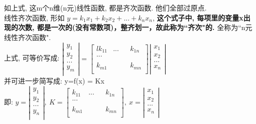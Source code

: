 \documentclass[UTF8]{ctexart}
\begin{document}
如上式, 这m个n维(n元)线性函数, 都是齐次函数. 他们全部过原点. \\
线性齐次函数, 形如 $	y=k_{1}x_1+k_{2}x_2+...+k_{n}x_n$, \textbf{这个式子中, 每项里的变量x出现的次数, 都是一次的(没有常数项)，整齐划一，故此称为``齐次"的.} 全称为``n元线性齐次函数". \\

上式, 可等价写成: 
$
\left| \begin{array}{l}
	y_1\\
	y_2\\
	...\\
	y_m\\
\end{array} \right|=\left[ \begin{matrix}{l}
	k_{11}&		...&		&		k_{1n}\\
	...&		&		&		\\
	&		&		&		\\
	k_{m1}&		&		&		k_{mn}\\
\end{matrix} \right] \left| \begin{array}{l}
	x_1\\
	x_2\\
	...\\
	x_n\\
\end{array} \right|
$ \\

并可进一步简写成: y=f(x) = Kx \\
即:
$
y=\left| \begin{array}{l}
	y_1\\
	y_2\\
	...\\
	y_n\\
\end{array} \right|,\ K=\left[ \begin{matrix}
	k_{11}&		...&		&		k_{1n}\\
	...&		&		&		\\
	&		&		&		\\
	k_{m1}&		&		&		k_{mn}\\
\end{matrix} \right] ,\ x=\left| \begin{array}{l}
	x_1\\
	x_2\\
	...\\
	x_n\\
\end{array} \right|
$\\
\vspace{1em} 
\end{document}
